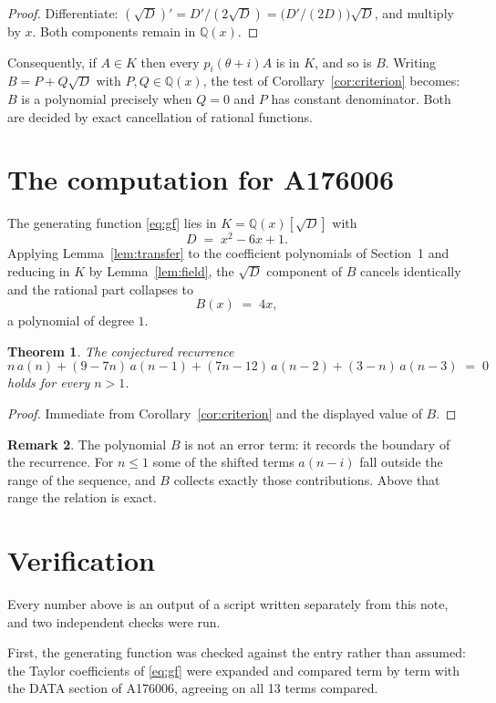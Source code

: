 \documentclass[11pt,a4paper]{article}
\theoremstyle{plain}
\newtheorem{theorem}{Theorem}
\theoremstyle{definition}
\newtheorem{remark}[theorem]{Remark}
\begin{document}
\begin{proof}
Differentiate: $(\sqrt{D})'=D'/(2\sqrt{D})=\bigl(D'/(2D)\bigr)\sqrt{D}$, and multiply by
$x$. Both components remain in $\mathbb{Q}(x)$.
\end{proof}

Consequently, if $A\in K$ then every $p_{i}(\theta+i)A$ is in $K$, and so is $B$. Writing
$B=P+Q\sqrt{D}$ with $P,Q\in\mathbb{Q}(x)$, the test of Corollary~\ref{cor:criterion}
becomes: $B$ is a polynomial precisely when $Q=0$ and $P$ has constant denominator. Both
are decided by exact cancellation of rational functions.

\section{The computation for A176006}

The generating function \eqref{eq:gf} lies in $K=\mathbb{Q}(x)[\sqrt{D}]$ with
\[
D \;=\; x^{2} - 6 x + 1 .
\]
Applying Lemma~\ref{lem:transfer} to the coefficient polynomials of Section~1 and reducing
in $K$ by Lemma~\ref{lem:field}, the $\sqrt{D}$ component of $B$ cancels identically and
the rational part collapses to
\[
B(x)\;=\;4 x ,
\]
a polynomial of degree $1$.

\begin{theorem}
The conjectured recurrence
\[
n\,a(n) + (9 - 7 n)\,a(n-1) + (7 n - 12)\,a(n-2) + (3 - n)\,a(n-3) \;=\;0
\]
holds for every $n>1$.
\end{theorem}

\begin{proof}
Immediate from Corollary~\ref{cor:criterion} and the displayed value of $B$.
\end{proof}

\begin{remark}
The polynomial $B$ is not an error term: it records the boundary of the recurrence. For
$n\le1$ some of the shifted terms $a(n-i)$ fall outside the range of the sequence,
and $B$ collects exactly those contributions. Above that range the relation is exact.
\end{remark}

\section{Verification}

Every number above is an output of a script written separately from this note, and two
independent checks were run.

First, the generating function was checked against the entry rather than assumed: the
Taylor coefficients of \eqref{eq:gf} were expanded and compared term by term with the DATA
section of A176006, agreeing on all 13 terms compared.
\end{document}

